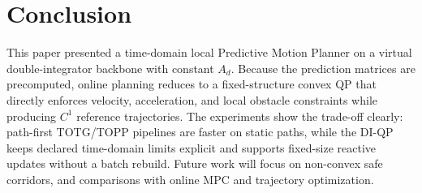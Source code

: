 

\section{Conclusion}\label{ix.-conclusion}

This paper presented a time-domain local Predictive Motion Planner on a
virtual double-integrator backbone with constant \(A_d\). Because the
prediction matrices are precomputed, online planning reduces to a
fixed-structure convex QP that directly enforces velocity, acceleration,
and local obstacle constraints while producing \(C^1\) reference
trajectories. The experiments show the trade-off clearly: path-first
TOTG/TOPP pipelines are faster on static paths, while the DI-QP keeps
declared time-domain limits explicit and supports fixed-size reactive updates
without a batch rebuild. Future work will focus on non-convex safe
corridors, and comparisons with online MPC and trajectory optimization.
